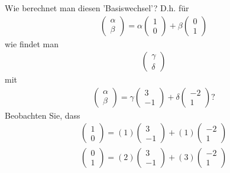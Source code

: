 \documentclass[11pt]{report}
\begin{document}
Wie berechnet man diesen 'Basiswechsel'?
D.h. für 
\begin{align}
\begin{pmatrix} \alpha \\ \beta \end{pmatrix} = \alpha \begin{pmatrix} 1 \\ 0\end{pmatrix} + \beta \begin{pmatrix} 0 \\ 1 \end{pmatrix}
\end{align}
wie findet man 
\begin{align}
\begin{pmatrix} \gamma \\ \delta \end{pmatrix}
\end{align}
mit
\begin{align}
\begin{pmatrix} \alpha \\ \beta\end{pmatrix} = \gamma \begin{pmatrix} 3 \\ -1\end{pmatrix} + \delta \begin{pmatrix} -2 \\ 1 \end{pmatrix} ?
\end{align}
Beobachten Sie, dass
\begin{align}
\begin{pmatrix} 1 \\ 0 \end{pmatrix} = (1) \begin{pmatrix} 3 \\ -1 \end{pmatrix} + (1) \begin{pmatrix} -2 \\ 1 \end{pmatrix} \\
\begin{pmatrix} 0 \\ 1 \end{pmatrix} = (2) \begin{pmatrix} 3 \\ -1 \end{pmatrix} + (3) \begin{pmatrix} -2 \\ 1 \end{pmatrix}
\end{align}
\end{document}
